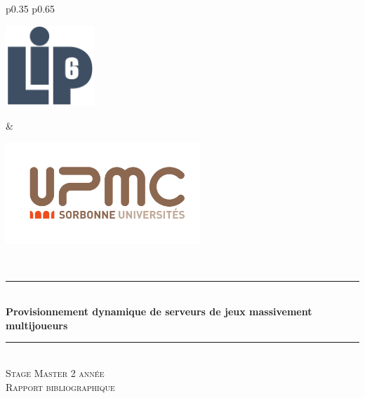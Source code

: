 \documentclass{article}
\begin{document}
\begin{titlepage}
	\newcommand{\hsp}{\hspace{20pt}}
	\newcommand{\HRule}{\rule{\linewidth}{0.5mm}}
  \begin{sffamily}
  \begin{center}

		\begin{tabular}{p{0.35\textwidth} p{0.65\textwidth}}
			\begin{center}\vspace{0pt} \includegraphics[width=0.25\textwidth]{logo-lip6.png}\end{center} &
			\begin{center}\vspace{0pt} \includegraphics[width=0.55\textwidth]{logo-upmc.png}\end{center}
		\end{tabular}
		
	
		~\\[2cm]

    

    \HRule \\[0.4cm]
    { \huge \bfseries Provisionnement dynamique de serveurs de jeux massivement multijoueurs\\[0.4cm] }

    \HRule \\[3cm]
		
		\textsc{\LARGE Stage Master 2\ieme{} année}\\[0.5cm]

    \textsc{\Large Rapport bibliographique}\\[4cm]


\end{center}
\end{sffamily}
\end{titlepage}
\end{document}
